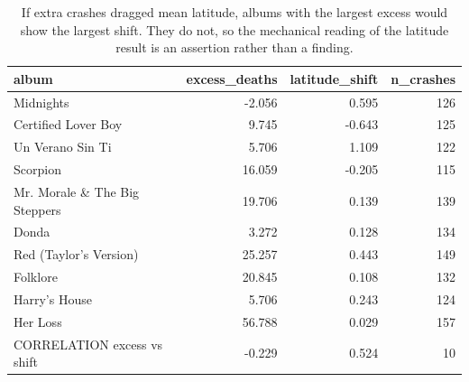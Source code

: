 \begin{table}
\caption{If extra crashes dragged mean latitude, albums with the largest excess would show the largest shift. They do not, so the mechanical reading of the latitude result is an assertion rather than a finding.}
\begin{tabular}{lrrr}
\toprule
album & excess\_deaths & latitude\_shift & n\_crashes \\
\midrule
Midnights & -2.056 & 0.595 & 126 \\
Certified Lover Boy & 9.745 & -0.643 & 125 \\
Un Verano Sin Ti & 5.706 & 1.109 & 122 \\
Scorpion & 16.059 & -0.205 & 115 \\
Mr. Morale \& The Big Steppers & 19.706 & 0.139 & 139 \\
Donda & 3.272 & 0.128 & 134 \\
Red (Taylor's Version) & 25.257 & 0.443 & 149 \\
Folklore & 20.845 & 0.108 & 132 \\
Harry's House & 5.706 & 0.243 & 124 \\
Her Loss & 56.788 & 0.029 & 157 \\
CORRELATION excess vs shift & -0.229 & 0.524 & 10 \\
\bottomrule
\end{tabular}
\end{table}
